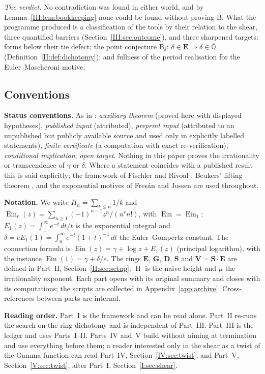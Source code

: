 \documentclass[11pt,a4paper]{article}
\newcommand{\Qbar}{\overline{\mathbb Q}}
\newcommand{\Ein}{\operatorname{Ein}}
\newcommand{\EE}{\mathbf E}
\newcommand{\GG}{\mathbf G}
\newcommand{\DD}{\mathbf D}
\newcommand{\Sring}{\mathbf S}
\newcommand{\Vring}{\mathbf V}
\DeclareMathOperator{\Ht}{H}
\theoremstyle{definition}
\theoremstyle{remark}
\numberwithin{equation}{section}
\begin{document}
\emph{The verdict.} No contradiction was found in either world, and by
Lemma~\ref{III:lem:bookkeeping} none could be found without proving $\mathrm B$. What the
programme produced is a classification of the tools by their relation to the shear, three
quantified barriers (Section~\ref{III:sec:outcome}), and three sharpened targets: forms
below their tie defect; the point conjecture $\mathrm B_\delta$:
$\delta\in\EE\Rightarrow\delta\in\Qbar$ (Definition~\ref{II:def:dichotomy}); and fullness of
the period realisation for the Euler--Mascheroni motive.

\subsection{Conventions}

\textbf{Status conventions.} As in \cite{M}: \emph{auxiliary theorem} (proved here with
displayed hypotheses), \emph{published input} (attributed), \emph{preprint input}
(attributed to an unpublished but publicly available source and used only in explicitly
labelled statements), \emph{finite certificate} (a computation with exact
re-verification), \emph{conditional implication}, \emph{open target}. Nothing in this
paper proves the irrationality or transcendence of $\gamma$ or $\delta$. Where a statement
coincides with a published result this is said explicitly; the framework of Fischler and
Rivoal \cite{FR2016,FR2018,FRmixed}, Beukers' lifting theorem \cite{Beukers}, and the
exponential motives of Fres\'an and Jossen \cite{FJ} are used throughout.

\textbf{Notation.} We write $H_n=\sum_{k\le n}1/k$ and $\Ein_r(z)=\sum_{n\ge1}(-1)^{n-1}z^n/(n^rn!)$,
with $\Ein=\Ein_1$; $E_1(z)=\int_z^\infty e^{-t}\,dt/t$ is the exponential integral and
$\delta=eE_1(1)=\int_0^\infty e^{-t}(1+t)^{-1}\,dt$ the Euler--Gompertz constant. The
connection formula is $\Ein(z)=\gamma+\log z+E_1(z)$ (principal logarithm), with the
instance $\Ein(1)=\gamma+\delta/e$. The rings $\EE$, $\GG$, $\DD$, $\Sring$ and
$\Vring=\Sring\cdot\EE$ are defined in Part~II, Section~\ref{II:sec:setup}; $\Ht$ is the
naive height and $\mu$ the irrationality exponent. Each part opens with its original
summary and closes with its computations; the scripts are collected in
Appendix~\ref{app:archive}. Cross-references between parts are internal.

\textbf{Reading order.} Part~I is the framework and can be read alone. Part~II re-runs the
search on the ring dichotomy and is independent of Part~III. Part~III is the ledger and
uses Parts~I--II. Parts~IV and~V build without aiming at termination and use everything
before them; a reader interested only in the shear as a twist of the Gamma function can
read Part~IV, Section~\ref{IV:sec:twist}, and Part~V, Section~\ref{V:sec:twist}, after
Part~I, Section~\ref{I:sec:shear}.
\end{document}
